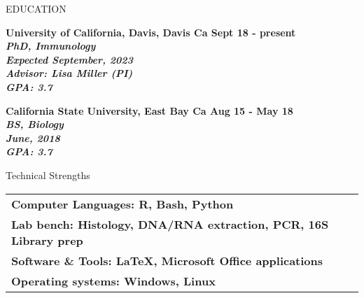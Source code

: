 \documentclass{resume} %
\begin{document}

\begin{rSection}{EDUCATION}

\bf University of California, Davis, Davis Ca
\hfill Sept 18 - present\\
\sl PhD, Immunology \\
\textit{Expected} September, 2023\\
\textit{Advisor:} Lisa Miller (PI) \\
\hfill GPA: 3.7

\bf California State University, East Bay Ca 
\hfill Aug 15 - May 18\\
\sl BS, Biology \\
\textit June, 2018 \\
\hfill GPA: 3.7

\end{rSection}


\begin{rSection}{Technical Strengths}

\begin{tabular}{ @{} >{\bfseries}l @{\hspace{6ex}}}
Computer Languages: R, Bash, Python \\
Lab bench: Histology, DNA/RNA extraction, PCR, 16S Library prep \\
Software \& Tools: LaTeX, Microsoft Office applications \\
Operating systems: Windows, Linux
\end{tabular}

\end{rSection}

\end{document}
